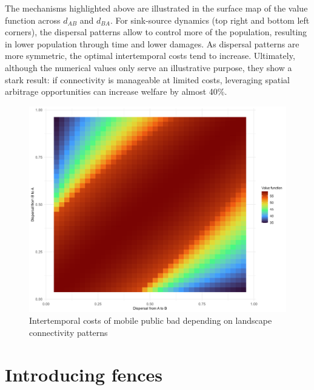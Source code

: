 The mechanisms highlighted above are illustrated in the surface map of the value function across $d_{AB}$ and $d_{BA}$. For sink-source dynamics (top right and bottom left corners), the dispersal patterns allow to control more of the population, resulting in lower population through time and lower damages. As dispersal patterns are more symmetric, the optimal intertemporal costs tend to increase. Ultimately, although the numerical values only serve an illustrative purpose, they show a stark result: if connectivity is manageable at limited costs, leveraging spatial arbitrage opportunities can increase welfare by almost 40\%. 

\begin{figure}[H]
	\centering
	\includegraphics[width=.8\textwidth]{figures/fences/heat_map_values_Baseline.jpg}
	\caption{Intertemporal costs of mobile public bad depending on landscape connectivity patterns}
\end{figure}



\section{Introducing fences}
